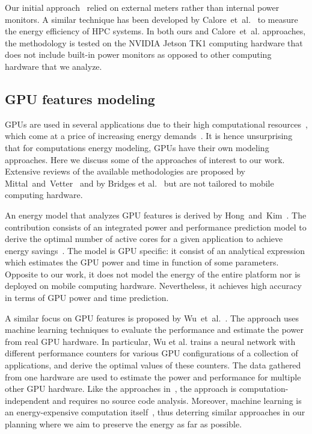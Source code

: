 Our initial approach~\citep{seewald2019hlpgpu} relied on external meters rather than internal power monitors. A similar technique has been developed by Calore~et~al.~\citep{calore2015energy} to measure the energy efficiency of HPC systems. In both ours and Calore~et~al. approaches, the methodology is tested on the NVIDIA Jetson TK1 computing hardware that does not include built-in power monitors as opposed to other computing hardware that we analyze.

\subsection{GPU features modeling}

GPUs are used in several applications due to their high computational resources~\citep{kasichayanula2012power}, which come at a price of increasing energy demands~\citep{mittal2014survey}. It is hence unsurprising that for computations energy modeling, GPUs have their own modeling approaches. Here we discuss some of the approaches of interest to our work. Extensive reviews of the available methodologies are proposed by Mittal~and~Vetter~\citep{mittal2014survey} and by Bridges et al.~\citep{bridges2016understanding} but are not tailored to mobile computing hardware.

An energy model that analyzes GPU features is derived by Hong~and~Kim~\citep{hong2010integrated}. The contribution consists of an integrated power and performance prediction model to derive the optimal number of active cores for a given application to achieve energy savings~\citep{hong2010integrated}. The model is GPU specific: it consist of an analytical expression which estimates the GPU power and time in function of some parameters. Opposite to our work, it does not model the energy of the entire platform nor is deployed on mobile computing hardware. Nevertheless, it achieves high accuracy in terms of GPU power and time prediction.

A similar focus on GPU features is proposed by Wu~et~al.~\citep{wu2015gpgpu}. The approach uses machine learning techniques to evaluate the performance and estimate the power from real GPU hardware. In particular, Wu et al. trains a neural network with different performance counters for various GPU configurations of a collection of applications, and derive the optimal values of these counters. The data gathered from one hardware are used to estimate the power and performance for multiple other GPU hardware. Like the approaches in~, the approach is computation-independent and requires no source code analysis. Moreover, machine learning is an energy-expensive computation itself~\citep{garcia2019estimation,yang2017method}, thus deterring similar approaches in our planning where we aim to preserve the energy as far as possible.

